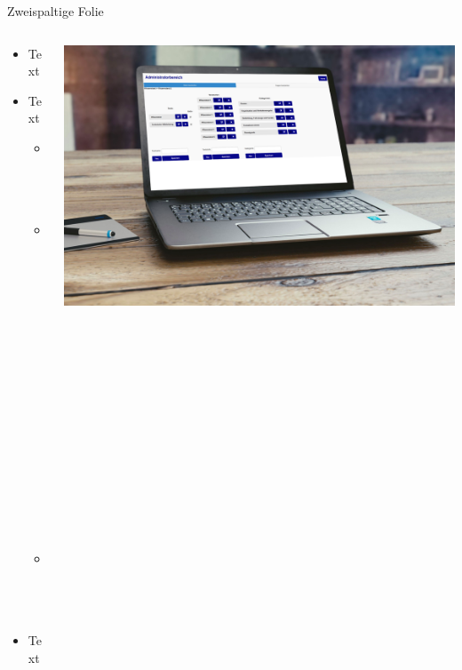 \documentclass[aspectratio=169,14pt]{beamer}
\begin{document}
    \begin{frame}[t]{Zweispaltige Folie}
        \begin{columns}[T]
            \begin{column}{0.5\textwidth}
                \begin{itemize}
                    \item Text
                    \item Text
                        \begin{itemize}
                            \item Text
                            \item Text
                                \begin{itemize}
                                    \item Text
                                    \item Text
                                    \item Text
                                \end{itemize}
                            \item Text
                        \end{itemize}
                    \item Text
                \end{itemize}
            \end{column}
            \begin{column}{0.5\textwidth}
                \includegraphics[height=0.5\textheight]{FiremansFriends-2-mockup.png}
            \end{column}
        \end{columns}
    \end{frame}
    
\end{document}
